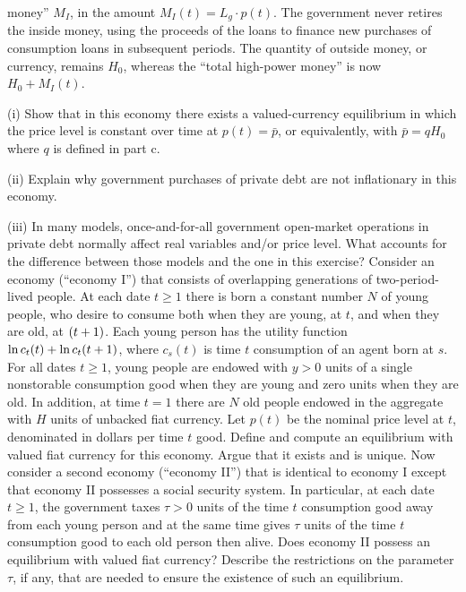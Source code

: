 money'' $M_I$, in the amount $M_I(t)=L_g\cdot p(t)$.  The
government never retires the inside money, using the proceeds of
the loans to finance new purchases of consumption loans in
subsequent periods.  The quantity of outside money, or currency,
remains $H_0$, whereas the ``total high-power money'' is now
$H_0+M_I(t)$. \item{(i)} Show that in this economy there
exists a valued-currency equilibrium in which the price level is
constant over time at $p(t)=\bar p$, or equivalently, with $\bar
p=qH_0$ where $q$ is defined in part c. \item{(ii)} Explain
why government purchases of private debt are not inflationary in
this economy. \item{(iii)} In many models,
once-and-for-all government open-market operations in private debt
normally affect real variables and/or price level.  What accounts
for the difference between those models and the one in this
exercise?
\medskip
{}
\medskip
\noindent Consider an economy (``economy I'') that consists of overlapping generations of
two-period-lived people.  At each date $t\ge 1$ there is born a constant
number $N$ of young people, who desire to consume both when they are young, at
$t$, and when they are old, at $({t+1})$.  Each young person has the utility
function $\mathop{\hbox{ln}} c_t(t)+\mathop{\hbox{ln}} c_t({t+1})$, where $c_s(t)$ is time $t$ consumption of
an agent born at $s$.  For all dates $t\ge 1$, young people are endowed with
$y>0$ units of a single nonstorable consumption good when they are young and
zero units when they are old.  In addition, at time $t=1$ there are $N$ old
people endowed in the aggregate with $H$ units of unbacked fiat currency.  Let
$p(t)$ be the nominal price level at $t$, denominated in dollars per time $t$
good.
\medskip{}
 Define and compute an equilibrium with valued fiat currency for this
economy.  Argue that it exists and is unique.  Now consider a second economy
(``economy II'') that is identical to economy I except that economy II
possesses a social security system.  In particular, at each date $t\ge 1$, the
government taxes $\tau>0$ units of the time $t$ consumption good away from each
young person and at the same time gives $\tau$ units of the time $t$
consumption good to each old person then alive.
\medskip{} Does economy II possess an equilibrium with valued fiat currency?
Describe the restrictions on the parameter $\tau$, if any, that are needed to
ensure the existence of such an equilibrium.
